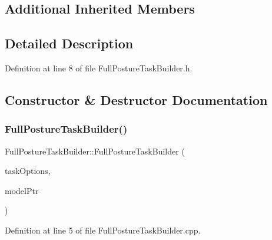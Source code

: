 \subsection*{Additional Inherited Members}


\subsection{Detailed Description}


Definition at line 8 of file Full\+Posture\+Task\+Builder.\+h.



\subsection{Constructor \& Destructor Documentation}
\hypertarget{classocra_1_1FullPostureTaskBuilder_a0b26fe3e55fe1c9881844d34651decea}{}\label{classocra_1_1FullPostureTaskBuilder_a0b26fe3e55fe1c9881844d34651decea} 
\subsubsection{\texorpdfstring{Full\+Posture\+Task\+Builder()}{FullPostureTaskBuilder()}}
{\footnotesize\ttfamily Full\+Posture\+Task\+Builder\+::\+Full\+Posture\+Task\+Builder (\begin{DoxyParamCaption}\item[{const \hyperlink{classocra_1_1TaskBuilderOptions}{Task\+Builder\+Options} \&}]{task\+Options,  }\item[{Model\+::\+Ptr}]{model\+Ptr }\end{DoxyParamCaption})}



Definition at line 5 of file Full\+Posture\+Task\+Builder.\+cpp.

\hypertarget{classocra_1_1FullPostureTaskBuilder_a4829af35d08e67294aad90e19c70c916}{}\label{classocra_1_1FullPostureTaskBuilder_a4829af35d08e67294aad90e19c70c916} 
